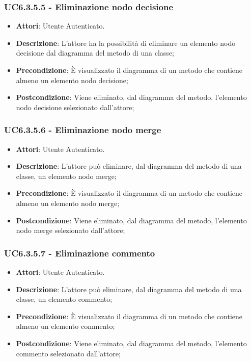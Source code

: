 \subsubsection{UC6.3.5.5 - Eliminazione nodo decisione} 
\label{sssec:UC6.3.5.5} 
\begin{itemize} 
\item \textbf{Attori}: Utente Autenticato.
\item \textbf{Descrizione}: L'attore ha la possibilità di eliminare un elemento nodo decisione dal diagramma del metodo di una classe;
\item \textbf{Precondizione}: È visualizzato il diagramma di un metodo che contiene almeno un elemento nodo decisione;
\item \textbf{Postcondizione}: Viene eliminato, dal diagramma del metodo,  l'elemento nodo decisione selezionato dall'attore;
\end{itemize} 
\subsubsection{UC6.3.5.6 - Eliminazione nodo merge} 
\label{sssec:UC6.3.5.6} 
\begin{itemize} 
\item \textbf{Attori}: Utente Autenticato.
\item \textbf{Descrizione}: L'attore può eliminare, dal diagramma del metodo di una classe, un elemento nodo merge;
\item \textbf{Precondizione}: È visualizzato il diagramma di un metodo che contiene almeno un elemento nodo merge;
\item \textbf{Postcondizione}: Viene eliminato, dal diagramma del metodo,  l'elemento nodo merge selezionato dall'attore;
\end{itemize} 
\subsubsection{UC6.3.5.7 - Eliminazione commento} 
\label{sssec:UC6.3.5.7} 
\begin{itemize} 
\item \textbf{Attori}: Utente Autenticato.
\item \textbf{Descrizione}: L'attore può eliminare, dal diagramma del metodo di una classe, un elemento commento;
\item \textbf{Precondizione}: È visualizzato il diagramma di un metodo che contiene almeno un elemento commento;
\item \textbf{Postcondizione}: Viene eliminato, dal diagramma del metodo,  l'elemento commento selezionato dall'attore;
\end{itemize} 
